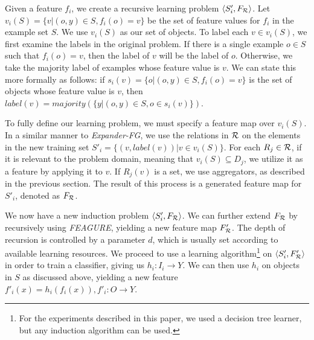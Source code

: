 \documentclass[twoside,11pt]{article}
\theoremstyle{definition}
\begin{document}

Given a feature $f_{i}$, we create a recursive learning problem $\langle S'_i,F_{\cal R} \rangle$. %
Let $v_i(S) = \{v | (o,y) \in S, f_{i}(o)=v\}$ be the set of feature values for $f_i$ in the example set $S$. %
We use $v_i(S)$ as our set of objects. To label each $v \in v_i(S)$, we first examine the labels in the original problem.
If there is a single example $o \in S$ such that $f_i(o)=v$, then the label of $v$ will be the label of $o$. Otherwise, we take the majority label of examples whose feature value is $v$. We can state this more formally as follows: if $s_i(v)=\{o | (o,y)\in S, f_{i}(o)=v\}$ is the set of objects whose feature value is $v$, then $label(v)=majority(\{y|(o,y)\in S, o\in s_i(v)\})$.

To fully define our learning problem, we must specify a feature map over $v_i(S)$. In a similar manner to \emph{Expander-FG}, we use the relations in ${\cal R}$ on the elements in the new training set $S'_i = \{ (v, label(v)) | v \in v_i(S) \}$.
For each $R_j\in {\cal R}$, if it is relevant to the problem domain, meaning that $v_i(S)\subseteq D_j$, we utilize it as a feature by applying it to $v$. If $R_j(v)$ is a set, we use aggregators, as described in the previous section. 
The result of this process is a generated feature map for $S'_i$, denoted as $F_{\cal R}$. 

We now have a new induction problem $\langle S'_i,F_{\cal R} \rangle$.
We can further extend $F_{\cal R}$ by recursively using \emph{FEAGURE}, yielding a new feature map $F'_{\cal R}$. The depth of recursion is controlled by a parameter $d$, which is usually set according to available learning resources.
We proceed to use a learning algorithm\footnote{For the experiments described in this paper, we used a decision tree learner, but any induction algorithm can be used.} on $\langle S'_i,F'_{\cal R} \rangle$ in order to train a classifier, giving us $h_i:I_i\rightarrow Y$. We can then use $h_i$ on objects in $S$ as discussed above, yielding a new feature $f'_{i}(x)=h_{i}(f_{i}(x)), f'_{i}:O\rightarrow Y$. 
\end{document}
